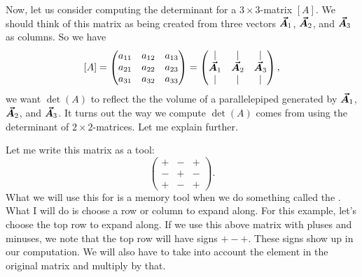 Now, let us consider computing the determinant for a $3\times 3$-matrix $[A]$.  We should think of this matrix as being created from three vectors $\boldsymbol{\vec{A}}_1$, $\boldsymbol{\vec{A}}_2$, and $\boldsymbol{\vec{A}}_3$ as columns. So we have
\[
[A]=\begin{pmatrix} a_{11} & a_{12} & a_{13} \\ a_{21} & a_{22} & a_{23} \\ a_{31} & a_{32} & a_{33}  \end{pmatrix} =
\begin{pmatrix} \vert & \vert & \vert \\ \boldsymbol{\vec{A}}_1 & \boldsymbol{\vec{A}}_2 & \boldsymbol{\vec{A}}_3 \\ \vert & \vert & \vert \end{pmatrix},
\]
we want $\det(A)$ to reflect the the volume of a parallelepiped generated by $\boldsymbol{\vec{A}}_1$, $\boldsymbol{\vec{A}}_2$, and $\boldsymbol{\vec{A}}_3$. It turns out the way we compute $\det(A)$ comes from using the determinant of $2\times 2$-matrices.  Let me explain further.

Let me write this matrix as a tool:
\[
\begin{pmatrix} + & - & +\\ - & + & - \\ + & - & + \end{pmatrix}.
\]
What we will use this for is a memory tool when we do something called the .  What I will do is choose a row or column to expand along.  For this example, let's choose the top row to expand along.  If we use this above matrix with pluses and minuses, we note that the top row will have signs $+-+$. These signs show up in our computation. We will also have to take into account the element in the original matrix and multiply by that.


